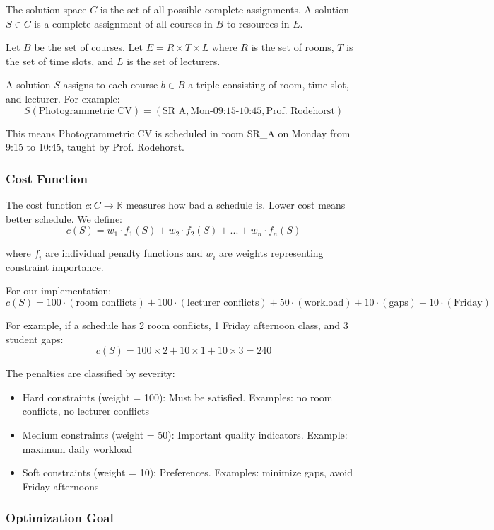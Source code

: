 \documentclass{article}
\begin{document}
The solution space $C$ is the set of all possible complete assignments. A solution $S \in C$ is a complete assignment of all courses in $B$ to resources in $E$.

Let $B$ be the set of courses. Let $E = R \times T \times L$ where $R$ is the set of rooms, $T$ is the set of time slots, and $L$ is the set of lecturers.

A solution $S$ assigns to each course $b \in B$ a triple consisting of room, time slot, and lecturer. For example:
$$S(\text{Photogrammetric CV}) = (\text{SR\_A}, \text{Mon-09:15-10:45}, \text{Prof. Rodehorst})$$

This means Photogrammetric CV is scheduled in room SR\_A on Monday from 9:15 to 10:45, taught by Prof. Rodehorst.

\subsubsection{Cost Function}

The cost function $c : C \to \mathbb{R}$ measures how bad a schedule is. Lower cost means better schedule. We define:
$$c(S) = w_1 \cdot f_1(S) + w_2 \cdot f_2(S) + ... + w_n \cdot f_n(S)$$

where $f_i$ are individual penalty functions and $w_i$ are weights representing constraint importance.

For our implementation:
$$c(S) = 100 \cdot (\text{room conflicts}) + 100 \cdot (\text{lecturer conflicts}) + 50 \cdot (\text{workload}) + 10 \cdot (\text{gaps}) + 10 \cdot (\text{Friday})$$

For example, if a schedule has 2 room conflicts, 1 Friday afternoon class, and 3 student gaps:
$$c(S) = 100 \times 2 + 10 \times 1 + 10 \times 3 = 240$$

The penalties are classified by severity:
\begin{itemize}
    \item Hard constraints (weight = 100): Must be satisfied. Examples: no room conflicts, no lecturer conflicts
    \item Medium constraints (weight = 50): Important quality indicators. Example: maximum daily workload
    \item Soft constraints (weight = 10): Preferences. Examples: minimize gaps, avoid Friday afternoons
\end{itemize}

\subsubsection{Optimization Goal}
\end{document}
